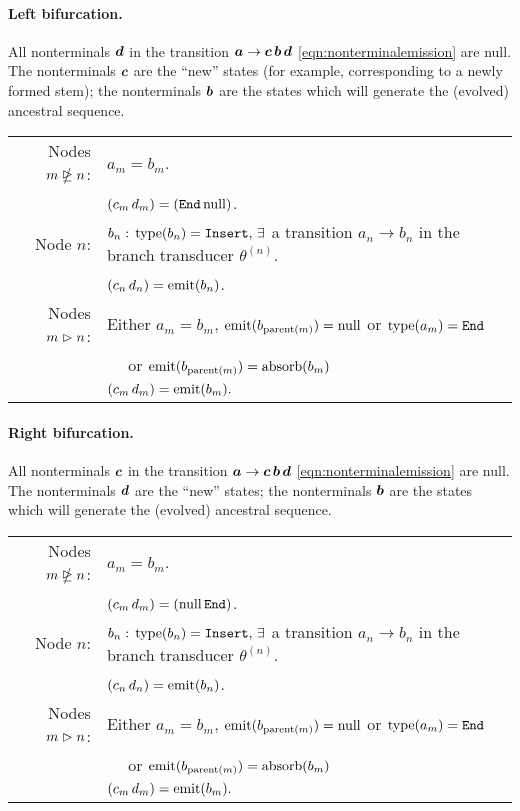 \documentclass[10pt]{article}
\begin{document}
\paragraph{Left bifurcation.}
All nonterminals $\boldsymbol{d}$ in the transition $\boldsymbol{a} \to \boldsymbol{c}\,\boldsymbol{b}\,\boldsymbol{d}$ \eqref{eqn:nonterminalemission} are null.
The nonterminals $\boldsymbol{c}$ are the ``new'' states (for example, corresponding to a newly formed stem);
the nonterminals $\boldsymbol{b}$ are the states which will generate the (evolved) ancestral sequence.

\begin{tabular}{rl}
  Nodes $m \ntrianglerighteq n$: & $a_m = b_m$. \\
  & $(c_m\,d_m) = (\mathtt{End}\,\mathrm{null})$. \\
  Node $n$: & $b_n:\,\operatorname{type}(b_n) = \mathtt{Insert},\,\exists$ a transition $a_n \to b_n$ in the branch transducer $\theta^{(n)}$. \\
  & $(c_n\,d_n) = \operatorname{emit}(b_n)$. \\
  Nodes $m \vartriangleright n$: & Either $a_m = b_m$, $\operatorname{emit}(b_{\operatorname{parent}(m)}) = \mathrm{null}$ or $\operatorname{type}(a_m) = \mathtt{End}$ \\
  & $\quad$ or $\operatorname{emit}(b_{\operatorname{parent}(m)}) = \operatorname{absorb}(b_m)$ \\
  & $(c_m\,d_m) = \operatorname{emit}(b_m) . $
\end{tabular}


\paragraph{Right bifurcation.}
All nonterminals $\boldsymbol{c}$ in the transition $\boldsymbol{a} \to \boldsymbol{c}\,\boldsymbol{b}\,\boldsymbol{d}$ \eqref{eqn:nonterminalemission} are null.
The nonterminals $\boldsymbol{d}$ are the ``new'' states;
the nonterminals $\boldsymbol{b}$ are the states which will generate the (evolved) ancestral sequence.

\begin{tabular}{rl}
  Nodes $m \ntrianglerighteq n$: & $a_m = b_m$. \\
  & $(c_m\,d_m) = (\mathrm{null}\,\mathtt{End})$. \\
  Node $n$: & $b_n:\,\operatorname{type}(b_n) = \mathtt{Insert},\,\exists$ a transition $a_n \to b_n$ in the branch transducer $\theta^{(n)}$. \\
  & $(c_n\,d_n) = \operatorname{emit}(b_n)$. \\
  Nodes $m \vartriangleright n$: & Either $a_m = b_m$, $\operatorname{emit}(b_{\operatorname{parent}(m)}) = \mathrm{null}$ or $\operatorname{type}(a_m) = \mathtt{End}$ \\
  & $\quad$ or $\operatorname{emit}(b_{\operatorname{parent}(m)}) = \operatorname{absorb}(b_m)$ \\
  & $(c_m\,d_m) = \operatorname{emit}(b_m) . $
\end{tabular}
\end{document}
